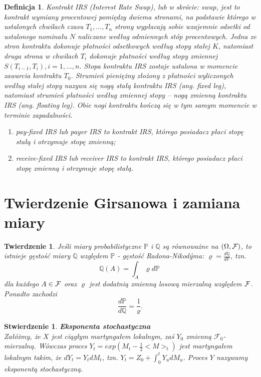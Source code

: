 \documentclass{mini}
\theoremstyle{mythstyle}
\newtheorem{Twierdzenie}{Twierdzenie}[chapter]
\newtheorem{Definicja}{Definicja}[chapter]
\newtheorem{Stwierdzenie}{Stwierdzenie}[chapter]
\begin{document}
\begin{Definicja}
	Kontrakt IRS (Interest Rate Swap), lub w skrócie: swap, jest to kontrakt wymiany procentowej pomiędzy dwiema stronami, na podstawie którego w ustalonych chwilach czasu $T_1,\ldots,T_n$ strony wypłacają sobie wzajemnie odsetki od ustalonego nominału $N$  naliczane według odmiennych stóp procentowych. Jedna ze stron kontraktu dokonuje płatności odsetkowych według stopy stałej $K$, natomiast druga strona w chwilach $T_i$ dokonuje płatności według stopy zmiennej $S(T_{i-1},T_i), i=1,\ldots,n$. Stopa kontraktu IRS zostaje ustalona w momencie zawarcia kontraktu $T_0$. Strumień pieniężny złożony z płatności wyliczonych według stałej stopy nazywa się nogą stałą kontraktu IRS (ang. fixed leg), natomiast strumień płatności według zmiennej stopy -- nogą zmienną kontraktu IRS (ang. floating leg). Obie nogi kontraktu kończą się w tym samym momencie w terminie zapadalności.
	\begin{enumerate}
		\item pay-fixed IRS lub payer IRS to kontrakt IRS, którego posiadacz płaci stopę stałą i otrzymuje stopę zmienną;
		\item receive-fixed IRS lub receiver IRS to kontrakt IRS, którego posiadacz płaci stopę zmienną i otrzymuje stopę stałą.
	\end{enumerate}
\end{Definicja}
\section{Twierdzenie Girsanowa i zamiana miary}
\begin{Twierdzenie}
	Jeśli miary probabilistyczne $\mathbb{P}$ i $\mathbb{Q}$ są
	równoważne na $(\Omega, {\cal F})$, to istnieje gęstość miary $\mathbb{Q}$
	względem $\mathbb{P}$ - gęstość Radona-Nikod\'{y}ma: $\varrho = \frac{d
		\mathbb{Q}}{d \mathbb{P}}$, tzn.
	\begin{equation*}
	\mathbb{Q}(A) = \int_A \varrho d
	\mathbb{P}\ 
	\end{equation*}
	dla każdego $A \in {\cal F}$ oraz $\varrho$ jest dodatnią zmienną losową mierzalną względem ${\cal F}$.\\ 
	Ponadto zachodzi $$\frac{d \mathbb{P}}{d \mathbb{Q}} = \frac{1}{\varrho}.$$
\end{Twierdzenie}
\begin{Stwierdzenie}\textbf{Eksponenta stochastyczna}\\
	Załóżmy, że $X$ jest ciągłym martyngałem lokalnym, zaś $Y_0$ zmienną $\mathcal{F}_0$-mierzalną. Wówczas proces $Y_t = exp(M_t - \frac{1}{2}<M>_t)$ jest martyngałem lokalnym takim, że $dY_t = Y_tdM_t$, tzn. $Y_t = Z_0 + \int_0^t Y_udM_u$. Proces $Y$ nazywamy eksponentą stochastyczną. \\
	
\end{Stwierdzenie}
\end{document}
